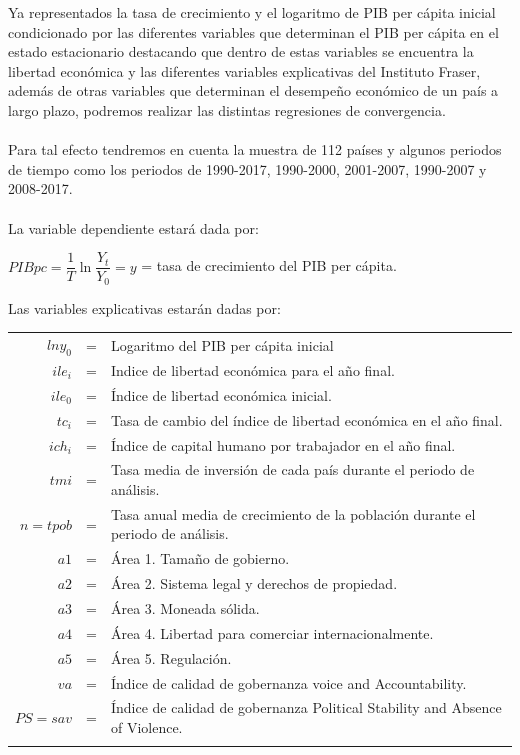 Ya representados la tasa de crecimiento y el logaritmo de PIB per cápita inicial condicionado por las diferentes variables que determinan el PIB per cápita en el estado estacionario destacando que dentro de estas variables se encuentra la libertad económica y las diferentes variables explicativas del Instituto Fraser, además de otras variables que determinan el desempeño económico de un país a largo plazo, podremos realizar las distintas regresiones de convergencia.\\\\
Para tal efecto tendremos en cuenta la muestra de 112 países y algunos periodos de tiempo como los periodos de 1990-2017, 1990-2000, 2001-2007, 1990-2007 y 2008-2017. \\\\
La variable dependiente estará dada por:

\begin{center}
$PIBpc = \dfrac{1}{T}\ln\dfrac{Y_t}{Y_0}=y$ = tasa de crecimiento del PIB per cápita.

\end{center}

Las variables explicativas estarán dadas por: 

\begin{center}
\begin{tabular}{rcl}
    $lny_0$&=&Logaritmo del PIB per cápita inicial\\
    $ile_i$&=&Indice de libertad económica para el año final.\\
    $ile_0$&=&Índice de libertad económica inicial.\\
    $ tc_i$&=&Tasa de cambio del índice de libertad económica en el año final.\\
    $ich_i$&=&Índice de capital humano por trabajador en el año final.\\
    $tmi$&=&Tasa media de inversión de cada país durante el periodo de análisis.\\
    $n=tpob$&=&Tasa anual media de crecimiento de la población durante el periodo de análisis.\\
    $a1$&=&Área 1. Tamaño de gobierno.\\
    $a2$&=&Área 2. Sistema legal y derechos de propiedad.\\
    $a3$&=&Área 3. Moneada sólida.\\
    $a4$&=&Área 4. Libertad para comerciar internacionalmente.\\
    $a5$&=&Área 5. Regulación.\\
    $va$&=&Índice de calidad de gobernanza voice and Accountability.\\
    $PS=sav$&=&Índice de calidad de gobernanza Political Stability and Absence of Violence.\\\\
\end{tabular}
\end{center}

